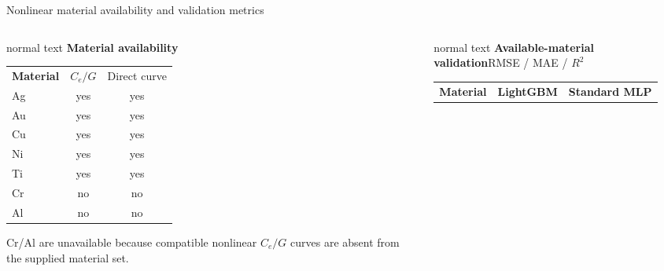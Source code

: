\documentclass[aspectratio=169,10pt]{beamer}
\begin{document}
\begin{frame}[t]{Nonlinear material availability and validation metrics}
  \hypertarget{supp:surrogates-nonlinear-material-metrics}{}
  \vspace{-0.18cm}\hfill
  \hspace{0.10cm}\GVBackupIndexButton
  \vspace{0.04cm}
  \begin{columns}[T,totalwidth=0.95\textwidth]
    \begin{column}{0.30\textwidth}
      \begin{beamercolorbox}[wd=\linewidth,sep=0.45em]{normal text}
        \small\textbf{\color{GVTeal}Material availability}\par
        \vspace{0.08cm}\centering\scriptsize
        \begin{tabular}{@{}lcc@{}}
          \rowcolor{GVTealTint}\textbf{Material} & \(C_e/G\) & Direct curve\\
          Ag & yes & yes\\
          Au & yes & yes\\
          Cu & yes & yes\\
          Ni & yes & yes\\
          Ti & yes & yes\\
          \rowcolor{GVRedTint}Cr & no & no\\
          \rowcolor{GVRedTint}Al & no & no
        \end{tabular}\par
        \vspace{0.10cm}\scriptsize Cr/Al are unavailable because compatible nonlinear \(C_e/G\) curves are absent from the supplied material set.
      \end{beamercolorbox}
    \end{column}
    \begin{column}{0.59\textwidth}
      \begin{beamercolorbox}[wd=\linewidth,sep=0.45em]{normal text}
        \small\textbf{\color{GVCouplingOrange}Available-material validation}\hfill\scriptsize RMSE / MAE / \(R^2\)\par
        \vspace{0.07cm}\centering\tiny
        \begin{tabular}{@{}lrrr|rrr@{}}
          \rowcolor{GVTealTint}\textbf{Material} & \multicolumn{3}{c|}{\textbf{LightGBM}} & \multicolumn{3}{c}{\textbf{Standard MLP}}\\

\end{tabular}
\end{beamercolorbox}
\end{column}
\end{columns}
\end{frame}
\end{document}
